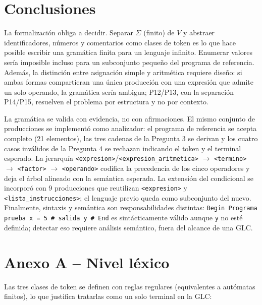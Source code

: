 \documentclass[11pt,letterpaper]{article}
\begin{document}
\section{Conclusiones}

La formalización obliga a decidir. Separar $\Sigma$ (finito) de $V$ y abstraer identificadores, números y
comentarios como clases de token es lo que hace posible escribir una gramática finita para un lenguaje
infinito. Enumerar valores sería imposible incluso para un subconjunto pequeño del programa de referencia.
Además, la distinción entre asignación simple y aritmética requiere diseño: si ambas formas compartieran una
única producción con una expresión que admite un solo operando, la gramática sería ambigua; P12/P13, con la
separación P14/P15, resuelven el problema por estructura y no por contexto.

La gramática se valida con evidencia, no con afirmaciones. El mismo conjunto de producciones se implementó
como analizador: el programa de referencia se acepta completo (21 elementos), las tres cadenas de la Pregunta
3 se derivan y los cuatro casos inválidos de la Pregunta 4 se rechazan indicando el token y el terminal
esperado. La jerarquía \lstinline|<expresion>|/\lstinline|<expresion_aritmetica>| \(\to\)
\lstinline|<termino>| \(\to\) \lstinline|<factor>| \(\to\) \lstinline|<operando>| codifica la precedencia de
los cinco operadores y deja el árbol alineado con la semántica esperada. La extensión del condicional se
incorporó con 9 producciones que reutilizan \lstinline|<expresion>| y \lstinline|<lista_instrucciones>|; el
lenguaje previo queda como subconjunto del nuevo. Finalmente, sintaxis y semántica son responsabilidades
distintas: \lstinline|Begin Programa prueba x = 5 # salida y # End| es sintácticamente válido aunque
\lstinline|y| no esté definida; detectar eso requiere análisis semántico, fuera del alcance de una GLC.


\clearpage
\section*{Anexo A -- Nivel léxico}

Las tres clases de token se definen con reglas regulares (equivalentes a autómatas finitos), lo que justifica
tratarlas como un solo terminal en la GLC:
\end{document}
